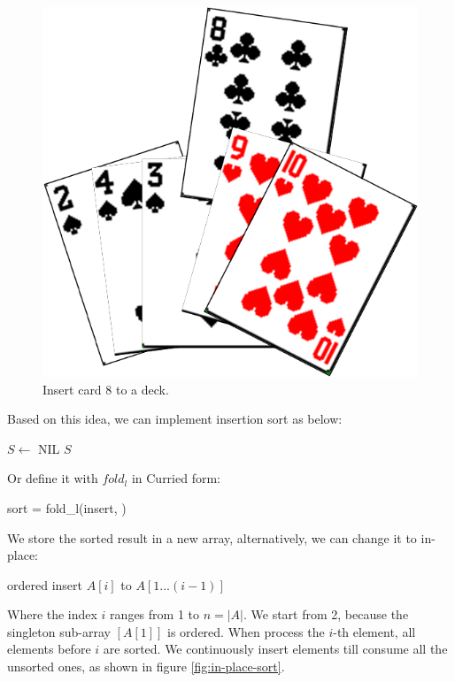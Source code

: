 \documentclass[b5paper]{article}
\begin{document}
\begin{figure}[htbp]
  \centering
  \includegraphics[scale=0.5]{img/card-deck.png}
  \caption{Insert card 8 to a deck.}
  \label{fig:hand-of-cards}
\end{figure}

Based on this idea, we can implement insertion sort as below:

\begin{algorithmic}[1]
  \State $S \gets$ NIL
    \State {}
  \EndFor
  \State \Return $S$
\EndFunction
\end{algorithmic}

Or define it with $fold_l$ in Curried form:

\be
sort = fold_l(insert, \nil)
\ee

We store the sorted result in a new array, alternatively, we can change it to in-place:

\begin{algorithmic}[1]
    \State ordered insert $A[i]$ to $A[1...(i-1)]$
  \EndFor
\EndFunction
\end{algorithmic}

Where the index $i$ ranges from 1 to $n = |A|$. We start from 2, because the singleton sub-array $[A[1]]$ is ordered. When process the $i$-th element, all elements before $i$ are sorted. We continuously insert elements till consume all the unsorted ones, as shown in figure \ref{fig:in-place-sort}.
\end{document}
